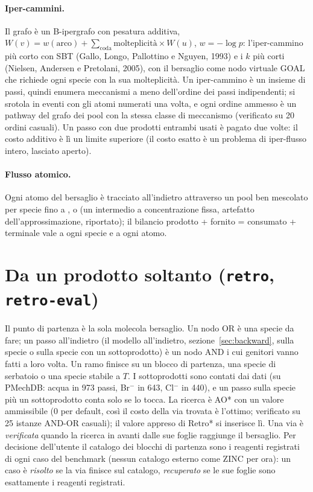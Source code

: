 \documentclass[11pt,a4paper]{report}
\newcommand{\code}[1]{\texttt{\detokenize{#1}}}
\begin{document}
\paragraph{Iper-cammini.} Il grafo è un B-ipergrafo con pesatura additiva, $W(v)=w(\text{arco})+
\sum_{\text{coda}}\text{molteplicità}\times W(u)$, $w=-\log p$: l'iper-cammino più corto con SBT (Gallo,
Longo, Pallottino e Nguyen, 1993) e i $k$ più corti (Nielsen, Andersen e Pretolani, 2005), con il
bersaglio come nodo virtuale GOAL che richiede ogni specie con la sua molteplicità. Un iper-cammino è un
insieme di passi, quindi enumera meccanismi a meno dell'ordine dei passi indipendenti; si srotola in eventi
con gli atomi numerati una volta, e ogni ordine ammesso è un pathway del grafo dei pool con la stessa classe
di meccanismo (verificato su 20 ordini casuali). Un passo con due prodotti entrambi usati è pagato due
volte: il costo additivo è lì un limite superiore (il costo esatto è un problema di iper-flusso intero,
lasciato aperto).

\paragraph{Flusso atomico.} Ogni atomo del bersaglio è tracciato all'indietro attraverso un pool ben
mescolato per specie fino a \code{START}, \code{RESERVOIR} o \code{PARTNER} (un intermedio a concentrazione
fissa, artefatto dell'approssimazione, riportato); il bilancio prodotto + fornito = consumato + terminale
vale a ogni specie e a ogni atomo.

\section{Da un prodotto soltanto (\texttt{retro}, \texttt{retro-eval})}
Il punto di partenza è la sola molecola bersaglio. Un nodo OR è una specie da fare; un passo all'indietro
(il modello all'indietro, sezione~\ref{sec:backward}, sulla specie o sulla specie con un sottoprodotto) è
un nodo AND i cui genitori vanno fatti a loro volta. Un ramo finisce su un blocco di partenza, una specie di
serbatoio o una specie stabile a $T$. I sottoprodotti sono contati dai dati (su PMechDB: acqua in 973
passi, Br$^-$ in 643, Cl$^-$ in 440), e un passo sulla specie più un sottoprodotto conta solo se lo tocca.
La ricerca è AO* con un valore ammissibile (0 per default, così il costo della via trovata è l'ottimo;
verificato su 25 istanze AND-OR casuali); il valore appreso di Retro* si inserisce lì. Una via è
\emph{verificata} quando la ricerca in avanti dalle sue foglie raggiunge il bersaglio. Per decisione
dell'utente il catalogo dei blocchi di partenza sono i reagenti registrati di ogni caso del benchmark
(nessun catalogo esterno come ZINC per ora): un caso è \emph{risolto} se la via finisce sul catalogo,
\emph{recuperato} se le sue foglie sono esattamente i reagenti registrati.
\end{document}
